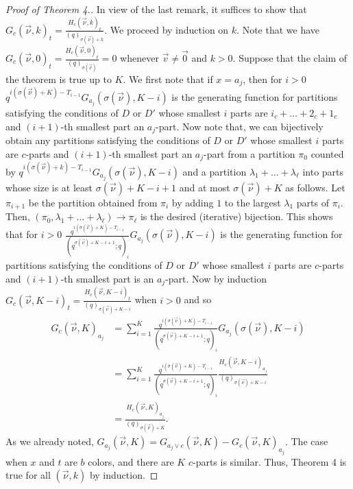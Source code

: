 \documentclass[12pt,a4paper]{amsart}
\theoremstyle{definition}
\theoremstyle{notation}
\theoremstyle{corollary}
\begin{document}
\begin{proof}[Proof of Theorem 4.]
In view of the last remark, it suffices to show that $G_{c}(\vec{\nu},k)_t=\frac{H_{c}(\vec{\nu},k)_t}{(q)_{\sigma(\vec{\nu})+k}}$. We proceed by induction on $k$. Note that we have $G_{c}(\vec{\nu},0)_t=\frac{H_{c}(\vec{\nu},0)_t}{(q)_{\sigma(\vec{\nu})}}=0$ whenever $\vec{v}\not=\vec{0}$ and $k>0$.  Suppose that the claim of the theorem is true up to $K$. We first note that if $x=a_j$, then for $i>0$ $ q^{i(\sigma(\vec{\nu})+K)-T_{i-1}}G_{a_j}(\sigma(\vec{\nu}),K-i)$ is the generating function for partitions satisfying the conditions of $D$ or $D'$ whose smallest $i$ parts are $i_c+\dots+2_c+1_c$ and $(i+1)$-th smallest part an $a_j$-part. Now note that, we can bijectively obtain any partitions satisfying the conditions of $D$ or $D'$ whose smallest $i$ parts are $c$-parts and $(i+1)$-th smallest part an $a_j$-part from a partition $\pi_0$ counted by $ q^{i(\sigma(\vec{\nu})+k)-T_{i-1}}G_{a_j}(\sigma(\vec{\nu}),K-i)$ and a partition $\lambda_1+\dots+\lambda_\ell$ into parts whose size is at least $\sigma(\vec{\nu})+K-i+1$ and at most $\sigma(\vec{\nu})+K$ as follows. Let $\pi_{i+1}$ be the partition obtained from $\pi_{i}$ by adding $1$ to the largest $\lambda_1$ parts of $\pi_i$. Then, $(\pi_0,\lambda_1+\dots+\lambda_\ell)\to\pi_\ell$ is the desired (iterative) bijection. This shows that for $i>0$ $ \frac{q^{i(\sigma(\vec{\nu})+K)-T_{i-1}}}{(q^{\sigma(\vec{\nu})+K-i+1};q)_i}G_{a_j}(\sigma(\vec{\nu}),K-i)$ is the generating function for partitions satisfying the conditions of $D$ or $D'$ whose smallest $i$ parts are $c$-parts and $(i+1)$-th smallest part is an $a_j$-part. Now by induction \(G_{c}(\vec{\nu},K-i)_t=\frac{H_{c}(\vec{\nu},K-i)_t}{(q)_{\sigma(\vec{\nu})+K-i}}\) when $i>0$ and so
\begin{align*}
    G_c(\vec{\nu},K)_{a_j}&=\sum_{i=1}^K \frac{q^{i(\sigma(\vec{\nu})+K)-T_{i-1}}}{(q^{\sigma(\vec{\nu})+K-i+1};q)_i}G_{a_j}(\sigma(\vec{\nu}),K-i)\\&=\sum_{i=1}^K \frac{q^{i(\sigma(\vec{\nu})+K)-T_{i-1}}}{(q^{\sigma(\vec{\nu})+K-i+1};q)_i}\frac{H_{c}(\vec{\nu},K-i)_{a_j}}{(q)_{\sigma(\vec{\nu})+K-i}}\\
    &=\frac{H_{c}(\vec{\nu},K)_{a_j}}{(q)_{\sigma(\vec{\nu})+K}}.
\end{align*}
As we already noted, $G_{a_j}(\vec{\nu},K)=G_{a_j\lor c}(\vec{\nu},K)-G_{c}(\vec{\nu},K)_{a_j}$. The case when $x$ and $t$ are $b$ colors, and there are $K$ $c$-parts is similar. Thus, Theorem 4 is true for all $(\vec{\nu},k)$ by induction. 
\end{proof}
\end{document}
